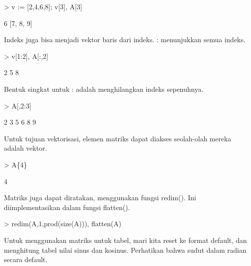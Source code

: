 \documentclass[a4paper,10pt]{article}
\begin{document}
\begin{eulernotebook}
\begin{eulercomment}
\begin{eulercomment}
\begin{eulercomment}
\begin{eulercomment}
\begin{eulercomment}
\begin{eulercomment}
\begin{eulerprompt}
> v := [2,4,6,8]; v[3], A[3]
\end{eulerprompt}
\begin{euleroutput}
  6
  [7,  8,  9]
\end{euleroutput}
\begin{eulercomment}
Indeks juga bisa menjadi vektor baris dari indeks. : menunjukkan semua
indeks.
\end{eulercomment}
\begin{eulerprompt}
> v[1:2], A[:,2]
\end{eulerprompt}
\begin{euleroutput}
  [2,  4]
              2 
              5 
              8 
\end{euleroutput}
\begin{eulercomment}
Bentuk singkat untuk : adalah menghilangkan indeks sepenuhnya.
\end{eulercomment}
\begin{eulerprompt}
> A[,2:3]
\end{eulerprompt}
\begin{euleroutput}
              2             3 
              5             6 
              8             9 
\end{euleroutput}
\begin{eulercomment}
Untuk tujuan vektorisasi, elemen matriks dapat diakses seolah-olah
mereka adalah vektor.
\end{eulercomment}
\begin{eulerprompt}
> A\{4\}
\end{eulerprompt}
\begin{euleroutput}
  4
\end{euleroutput}
\begin{eulercomment}
Matriks juga dapat diratakan, menggunakan fungsi redim(). Ini
diimplementasikan dalam fungsi flatten().
\end{eulercomment}
\begin{eulerprompt}
> redim(A,1,prod(size(A))), flatten(A)
\end{eulerprompt}
\begin{euleroutput}
  [1,  2,  3,  4,  5,  6,  7,  8,  9]
  [1,  2,  3,  4,  5,  6,  7,  8,  9]
\end{euleroutput}
\begin{eulercomment}
Untuk menggunakan matriks untuk tabel, mari kita reset ke format
default, dan menghitung tabel nilai sinus dan kosinus. Perhatikan
bahwa sudut dalam radian secara default.
\end{eulercomment}

\end{eulercomment}
\end{eulercomment}
\end{eulercomment}
\end{eulercomment}
\end{eulercomment}
\end{eulercomment}
\end{eulernotebook}
\end{document}
